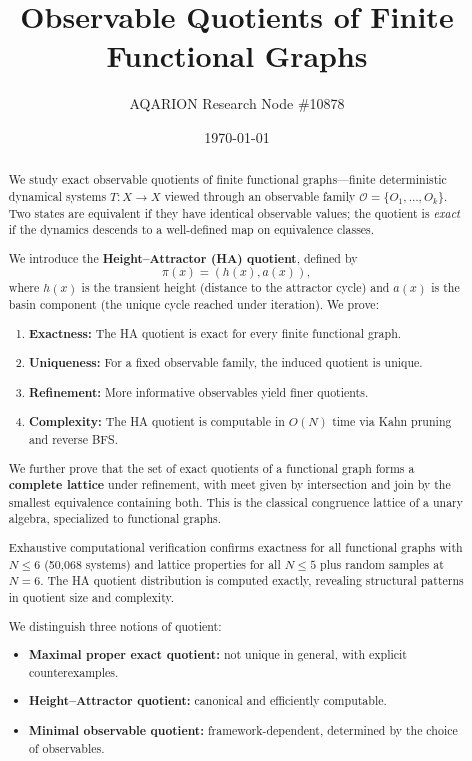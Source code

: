 \documentclass[11pt, a4paper]{article}
\title{Observable Quotients of Finite Functional Graphs}
\author{AQARION Research Node \#10878}
\date{\today}
\theoremstyle{definition}
\theoremstyle{remark}
\begin{document}
\maketitle

\begin{abstract}
We study exact observable quotients of finite functional graphs—finite deterministic dynamical systems \(T: X \to X\) viewed through an observable family \(\mathcal O = \{O_1, \dots, O_k\}\). Two states are equivalent if they have identical observable values; the quotient is \emph{exact} if the dynamics descends to a well-defined map on equivalence classes.

We introduce the \textbf{Height–Attractor (HA) quotient}, defined by
\[
\pi(x) = (h(x), a(x)),
\]
where \(h(x)\) is the transient height (distance to the attractor cycle) and \(a(x)\) is the basin component (the unique cycle reached under iteration). We prove:

\begin{enumerate}[label=(\arabic*)]
\item \textbf{Exactness:} The HA quotient is exact for every finite functional graph.
\item \textbf{Uniqueness:} For a fixed observable family, the induced quotient is unique.
\item \textbf{Refinement:} More informative observables yield finer quotients.
\item \textbf{Complexity:} The HA quotient is computable in \(O(N)\) time via Kahn pruning and reverse BFS.
\end{enumerate}

We further prove that the set of exact quotients of a functional graph forms a \textbf{complete lattice} under refinement, with meet given by intersection and join by the smallest equivalence containing both. This is the classical congruence lattice of a unary algebra, specialized to functional graphs.

Exhaustive computational verification confirms exactness for all functional graphs with \(N \le 6\) (50,068 systems) and lattice properties for all \(N \le 5\) plus random samples at \(N=6\). The HA quotient distribution is computed exactly, revealing structural patterns in quotient size and complexity.

We distinguish three notions of quotient:
\begin{itemize}
\item \textbf{Maximal proper exact quotient:} not unique in general, with explicit counterexamples.
\item \textbf{Height–Attractor quotient:} canonical and efficiently computable.
\item \textbf{Minimal observable quotient:} framework-dependent, determined by the choice of observables.
\end{itemize}


\end{abstract}
\end{document}
